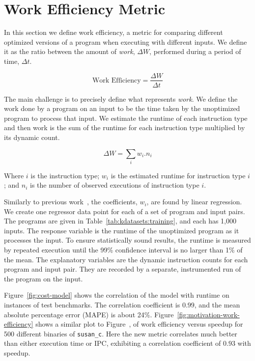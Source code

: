 \section{Work Efficiency Metric} \label{sec:metric}

    In this section we define work efficiency, a metric for comparing different optimized versions of a program when executing with
    different inputs. We define it as the ratio between the amount of \textit{work}, $\Delta W$, performed during a period of time, $\Delta
    t$.

    \[
       \textrm{Work Efficiency} = \frac{\Delta W}{\Delta t}
    \]

    The main challenge is to precisely define what represents \textit{work}. We define the work done by a program on an input to be the
    time taken by the unoptimized program to process that input. We estimate the runtime of each instruction type and then work is the sum
    of the runtime for each instruction type multiplied by its dynamic count.

    \[ \Delta W = \sum_i w_i.n_i \]

    Where $i$ is the instruction type; $w_i$ is the estimated runtime for instruction type $i$; and $n_i$ is the number of observed
    executions of instruction type $i$.

    Similarly to previous work~\citep{giusto01,powell09,brandolese11}, the coefficients, $w_i$, are found by linear regression. We create
    one regressor data point for each of a set of program and input pairs. The programs are given in Table~\ref{tab:kdatasets:training},
    and each has 1,000 inputs. The response variable is the runtime of the unoptimized program as it processes the input. To ensure
    statistically sound results, the runtime is measured by repeated execution until the 99\% confidence interval is no larger than 1\% of
    the mean. The explanatory variables are the dynamic instruction counts for each program and input pair. They are recorded by a separate,
    instrumented run of the program on the input.

    Figure~\ref{fig:cost-model} shows the correlation of the model with runtime on instances of test benchmarks. The correlation
    coefficient is $0.99$, and the mean absolute percentage error (MAPE) is about 24\%.
    Figure~\ref{fig:motivation-work-efficiency} shows a similar plot to Figure~\FIXME{\ref{fig:motivation-metric}},
    of work efficiency versus speedup for 500 different binaries of \texttt{susan\_c}.
    Here the new metric correlates much better than either execution time or IPC,
    exhibiting a correlation coefficient of $0.93$ with speedup.

